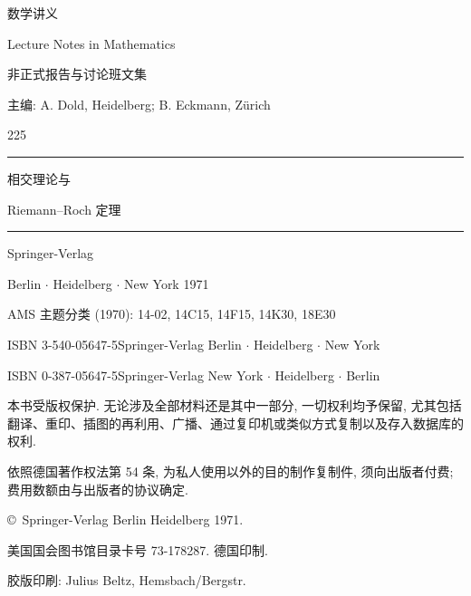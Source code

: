 \begin{titlepage}
\thispagestyle{empty}
\sffamily
{\LARGE 数学讲义\par Lecture Notes in Mathematics\par}
\vspace{.6em}
非正式报告与讨论班文集\par
主编: A. Dold, Heidelberg; B. Eckmann, Zürich\par
\vspace{4em}
{\Large 225\par}
\vspace{.4em}\hrule\vspace{1em}
{\LARGE 相交理论与\par Riemann--Roch 定理\par}
\vfill\hrule\vspace{1em}
{\large Springer-Verlag\par Berlin $\cdot$ Heidelberg $\cdot$ New York 1971\par}
\end{titlepage}
\clearpage
\thispagestyle{empty}
\null\vfill
\begin{small}
\noindent AMS 主题分类 (1970): 14-02, 14C15, 14F15, 14K30, 18E30\par
\vspace{1em}
\noindent ISBN 3-540-05647-5\quad Springer-Verlag Berlin $\cdot$ Heidelberg $\cdot$ New York\par
\noindent ISBN 0-387-05647-5\quad Springer-Verlag New York $\cdot$ Heidelberg $\cdot$ Berlin\par
\vspace{1.5em}
\noindent 本书受版权保护. 无论涉及全部材料还是其中一部分, 一切权利均予保留, 尤其包括翻译、重印、插图的再利用、广播、通过复印机或类似方式复制以及存入数据库的权利.\par
依照德国著作权法第 54 条, 为私人使用以外的目的制作复制件, 须向出版者付费; 费用数额由与出版者的协议确定.\par
\vspace{.8em}
\noindent \copyright\ Springer-Verlag Berlin Heidelberg 1971.\par
\noindent 美国国会图书馆目录卡号 73-178287. 德国印制.\par
\noindent 胶版印刷: Julius Beltz, Hemsbach/Bergstr.\par
\end{small}
\clearpage
